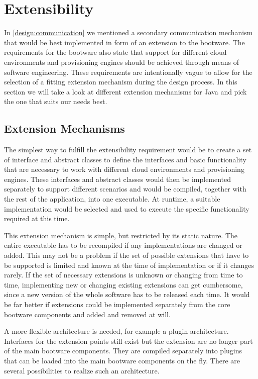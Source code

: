 \section{Extensibility}
\label{design:extensibility}

In \autoref{design:communication} we mentioned a secondary communication mechanism that would be best implemented in form of an extension to the bootware.
The requirements for the bootware also state that support for different cloud environments and provisioning engines should be achieved through means of software engineering.
These requirements are intentionally vague to allow for the selection of a fitting extension mechanism during the design process.
In this section we will take a look at different extension mechanisms for Java and pick the one that suits our needs best.

\subsection{Extension Mechanisms}

The simplest way to fulfill the extensibility requirement would be to create a set of interface and abstract classes to define the interfaces and basic functionality that are necessary to work with different cloud environments and provisioning engines.
These interfaces and abstract classes would then be implemented separately to support different scenarios and would be compiled, together with the rest of the application, into one executable.
At runtime, a suitable implementation would be selected and used to execute the specific functionality required at this time.

This extension mechanism is simple, but restricted by its static nature.
The entire executable has to be recompiled if any implementations are changed or added.
This may not be a problem if the set of possible extensions that have to be supported is limited and known at the time of implementation or if it changes rarely.
If the set of necessary extensions is unknown or changing from time to time, implementing new or changing existing extensions can get cumbersome, since a new version of the whole software has to be released each time.
It would be far better if extensions could be implemented separately from the core bootware components and added and removed at will.

A more flexible architecture is needed, for example a plugin architecture.
Interfaces for the extension points still exist but the extension are no longer part of the main bootware components.
They are compiled separately into plugins that can be loaded into the main bootware components on the fly.
There are several possibilities to realize such an architecture.

